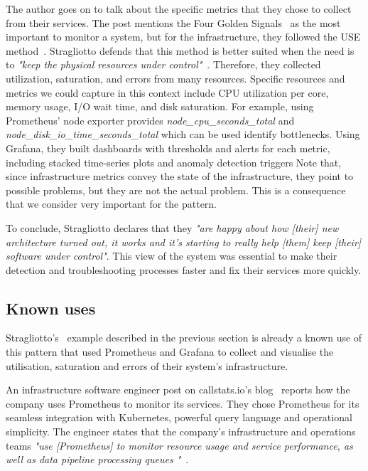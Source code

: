 \documentclass[runningheads]{llncs}
\begin{document}
The author goes on to talk about the specific metrics that they chose to collect from their services. The post mentions the Four Golden Signals~\cite{Ewaschuk-SRE-2016} as the most important to monitor a system, but for the infrastructure, they followed the USE method~\cite{Gregg-2013}. Stragliotto defends that this method is better suited when the need is to \textit{"keep the physical resources under control"}~\cite{Stragliotto-2019}. Therefore, they collected utilization, saturation, and errors from many resources. Specific resources and metrics we could capture in this context include CPU utilization per core, memory usage, I/O wait time, and disk saturation. For example, using Prometheus' node exporter provides \textit{node\_cpu\_seconds\_total} and \textit{node\_disk\_io\_time\_seconds\_total} which can be used identify bottlenecks. Using Grafana, they built dashboards with thresholds and alerts for each metric, including stacked time-series plots and anomaly detection triggers
%
Note that, since infrastructure metrics convey the state of the infrastructure, they point to possible problems, but they are not the actual problem. This is a consequence that we consider very important for the pattern.

To conclude, Stragliotto declares that they \textit{"are happy about how [their] new architecture turned out, it works and it's starting to really help [them] keep [their] software under control"}. This view of the system was essential to make their detection and troubleshooting processes faster and fix their services more quickly.

\subsection{Known uses}
Stragliotto's~\cite{Stragliotto-2019} example described in the previous section is already a known use of this pattern that used Prometheus and Grafana to collect and visualise the utilisation, saturation and errors of their system's infrastructure.

An infrastructure software engineer post on callstats.io's blog~\cite{Callstats-2018} reports how the company uses Prometheus to monitor its services. They chose Prometheus for its seamless integration with Kubernetes, powerful query language and operational simplicity. The engineer states that the company's infrastructure and operations teams \textit{"use [Prometheus] to monitor resource usage and service performance, as well as data pipeline processing queues "}~\cite{Callstats-2018}.
\end{document}
